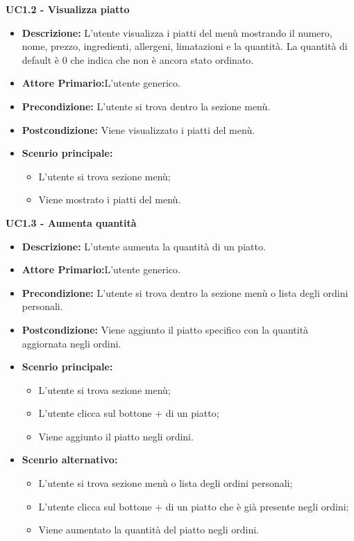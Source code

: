 \textbf{UC1.2 - Visualizza piatto}
\begin{itemize}
    \item \textbf{Descrizione:} L'utente visualizza i piatti del menù mostrando il numero, nome, prezzo, ingredienti, allergeni, limatazioni e la quantità. La quantità di default è 0 che indica che non è ancora stato ordinato.
    \item \textbf{Attore Primario:}L'utente generico.
    \item \textbf{Precondizione:} L'utente si trova dentro la sezione menù.
    \item \textbf{Postcondizione:} Viene visualizzato i piatti del menù.
    \item \textbf{Scenrio principale:}  
    \begin{itemize}
        \item L'utente si trova sezione menù;
        \item Viene mostrato i piatti del menù.
    \end{itemize}
\end{itemize}
\textbf{UC1.3 - Aumenta quantità}
\begin{itemize}
    \item \textbf{Descrizione:} L'utente aumenta la quantità di un piatto.
    \item \textbf{Attore Primario:}L'utente generico.
    \item \textbf{Precondizione:} L'utente si trova dentro la sezione menù o lista degli ordini personali.
    \item \textbf{Postcondizione:} Viene aggiunto il piatto specifico con la quantità aggiornata negli ordini.
    \item \textbf{Scenrio principale:}
    \begin{itemize}
        \item L'utente si trova sezione menù;
        \item L'utente clicca sul bottone + di un piatto;
        \item Viene aggiunto il piatto negli ordini.
    \end{itemize}
    \item \textbf{Scenrio alternativo:}
    \begin{itemize}
        \item L'utente si trova sezione menù o lista degli ordini personali;
        \item L'utente clicca sul bottone + di un piatto che è già presente negli ordini;
        \item Viene aumentato la quantità del piatto negli ordini.
    \end{itemize}
\end{itemize}
